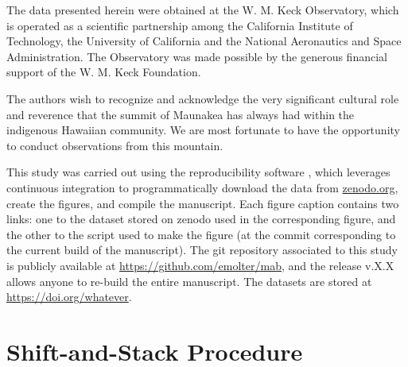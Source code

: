 \documentclass[preprint]{aastex631}
\begin{document}
\begin{acknowledgements}

The data presented herein were obtained at the W. M. Keck Observatory, which is operated as a scientific partnership among the California Institute of Technology, the University of California and the National Aeronautics and Space Administration. The Observatory was made possible by the generous financial support of the W. M. Keck Foundation.

The authors wish to recognize and acknowledge the very significant cultural role and reverence that the summit of Maunakea has always had within the indigenous Hawaiian community.  We are most fortunate to have the opportunity to conduct observations from this mountain.

This study was carried out using the reproducibility software
\href{https://github.com/showyourwork/showyourwork}{\showyourwork}
\citep{luger21}, which leverages continuous integration to
programmatically download the data from
\href{https://zenodo.org/}{zenodo.org}, create the figures, and
compile the manuscript. Each figure caption contains two links: one
to the dataset stored on zenodo used in the corresponding figure,
and the other to the script used to make the figure (at the commit
corresponding to the current build of the manuscript). The git
repository associated to this study is publicly available at
\url{https://github.com/emolter/mab}, and the release
v.X.X allows anyone to re-build the entire manuscript. The datasets
are stored at \url{https://doi.org/whatever}.

\end{acknowledgements}



\appendix

\restartappendixnumbering

\section{Shift-and-Stack Procedure}
\label{s:shiftandstack}
\end{document}

